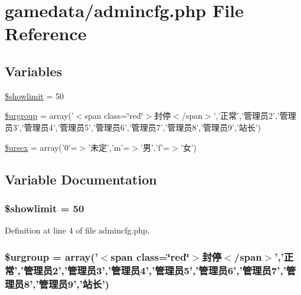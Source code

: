 \hypertarget{admincfg_8php}{\section{gamedata/admincfg.php File Reference}
\label{admincfg_8php}
}
\subsection*{Variables}
\begin{DoxyCompactItemize}
\item 
\hyperlink{admincfg_8php_af2af1e29fdca32dbd98071901d7c18f3}{\$showlimit} = 50
\item 
\hyperlink{admincfg_8php_a88a1bee34460b533b606a2f1e19afb59}{\$urgroup} = array('$<$span class=\char`\"{}red\char`\"{}$>$封停$<$/span$>$','正常','管理员2','管理员3','管理员4','管理员5','管理员6','管理员7','管理员8','管理员9','站长')
\item 
\hyperlink{admincfg_8php_ad0eb94a4df3d6d75d937b2101361364b}{\$ursex} = array('0'=$>$'未定','m'=$>$'男','f'=$>$'女')
\end{DoxyCompactItemize}


\subsection{Variable Documentation}
\hypertarget{admincfg_8php_af2af1e29fdca32dbd98071901d7c18f3}{
\subsubsection[{\$showlimit}]{\setlength{\rightskip}{0pt plus 5cm}\$showlimit = 50}}\label{admincfg_8php_af2af1e29fdca32dbd98071901d7c18f3}


Definition at line 4 of file admincfg.\+php.

\hypertarget{admincfg_8php_a88a1bee34460b533b606a2f1e19afb59}{
\subsubsection[{\$urgroup}]{\setlength{\rightskip}{0pt plus 5cm}\$urgroup = array('$<$span class=\char`\"{}red\char`\"{}$>$封停$<$/span$>$','正常','管理员2','管理员3','管理员4','管理员5','管理员6','管理员7','管理员8','管理员9','站长')}}\label{admincfg_8php_a88a1bee34460b533b606a2f1e19afb59}


